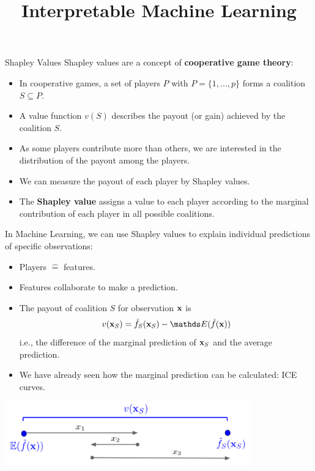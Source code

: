 \documentclass[11pt,compress,t,notes=noshow, aspectratio=169, xcolor=table]{beamer}
\title{Interpretable Machine Learning}
\date{}
\begin{document}
\newcommand{\learninggoals}{
\item Understand structure of tabular data
\item Understand difference between target and feature
\item Understand difference between labeled and unlabeled data
\item Know concept of data-generating process}


\begin{vbframe}{Shapley Values}
Shapley values are a concept of \textbf{cooperative game theory}:
\begin{itemize}
  \item In cooperative games, a set of players $P$ with $P = \{1, \hdots, p\}$ forms a coalition $S \subseteq P$.
  \item A value function $v(S)$ describes the payout (or gain) achieved by the coalition $S$.
  \item As some players contribute more than others, we are interested in the distribution of the payout among the players.
  \item We can measure the payout of each player by Shapley values.
  \item The \textbf{Shapley value} assigns a value to each player according to the marginal contribution of each player in all possible coalitions.
\end{itemize}

\framebreak
In Machine Learning, we can use Shapley values to explain individual predictions of specific observations:
\begin{itemize}
  \item Players $\hat{=}$ features.
  \item Features collaborate to make a prediction.
  \item The payout of coalition $S$ for observation $\xv$ is
  $$v(\xv_S) =  \fh_{S} (\xv_S) - \E (\fh(\xv))$$
  i.e., the difference of the marginal prediction of $\xv_S$ and the average prediction.
  \item We have already seen how the marginal prediction can be calculated: ICE curves.
\end{itemize}
\begin{center}
\vspace{-0.3cm}
\includegraphics[width=0.8\textwidth]{figure_man/shapley_valuefct}
\end{center}
\framebreak


\end{vbframe}
\end{document}
